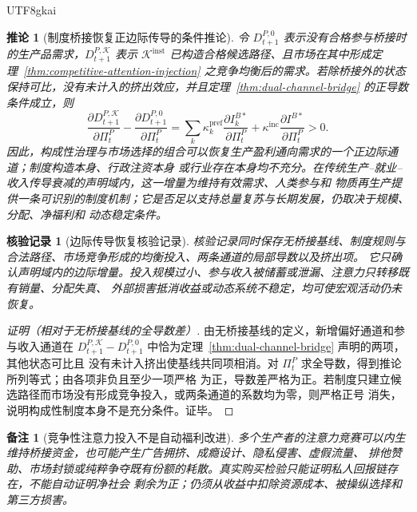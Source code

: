 \documentclass[12pt,a4paper,openany]{report}
\newtheorem{corollary}{推论}[chapter]
\newtheorem{remark}{备注}[chapter]
\newtheorem{Certificate}{核验记录}[chapter]
\begin{document}
\begin{CJK*}{UTF8}{gkai}
\begin{corollary}[制度桥接恢复正边际传导的条件推论]
\label{cor:institutional-bridge-restores-transmission}
令 \(D_{t+1}^{P,0}\) 表示没有合格参与桥接时的生产品需求，\(D_{t+1}^{P,\mathcal K}\) 表示
\(\mathcal K^{\mathrm{inst}}\) 已构造合格候选路径、且市场在其中形成定理~\ref{thm:competitive-attention-injection}
之竞争均衡后的需求。若除桥接外的状态保持可比，没有未计入的挤出效应，并且定理~\ref{thm:dual-channel-bridge}
的正导数条件成立，则
\[
  \frac{\partial D_{t+1}^{P,\mathcal K}}{\partial\Pi_t^P}
  -
  \frac{\partial D_{t+1}^{P,0}}{\partial\Pi_t^P}
  =
  \sum_k\kappa_k^{\mathrm{pref}}
  \frac{\partial I_k^{B*}}{\partial\Pi_t^P}
  +\kappa^{\mathrm{inc}}
  \frac{\partial I^{B*}}{\partial\Pi_t^P}
  >0.
\]
因此，构成性治理与市场选择的组合可以恢复生产盈利通向需求的一个正边际通道；制度构造本身、行政注资本身
或行业存在本身均不充分。在传统生产--就业--收入传导衰减的声明域内，这一增量为维持有效需求、人类参与和
物质再生产提供一条可识别的制度机制；它是否足以支持总量复苏与长期发展，仍取决于规模、分配、净福利和
动态稳定条件。
\end{corollary}

\begin{Certificate}[边际传导恢复核验记录]
核验记录同时保存无桥接基线、制度规则与合法路径、市场竞争形成的均衡投入、两条通道的局部导数以及挤出项。
它只确认声明域内的边际增量。投入规模过小、参与收入被储蓄或泄漏、注意力只转移既有销量、分配失真、
外部损害抵消收益或动态系统不稳定，均可使宏观活动仍未恢复。
\end{Certificate}

\begin{proof}[证明（相对于无桥接基线的全导数差）]
由无桥接基线的定义，新增偏好通道和参与收入通道在
\(D_{t+1}^{P,\mathcal K}-D_{t+1}^{P,0}\) 中恰为定理~\ref{thm:dual-channel-bridge} 声明的两项，其他状态可比且
没有未计入挤出使基线共同项相消。对 \(\Pi_t^P\) 求全导数，得到推论所列等式；由各项非负且至少一项严格
为正，导数差严格为正。若制度只建立候选路径而市场没有形成竞争投入，或两条通道的系数均为零，则严格正号
消失，说明构成性制度本身不是充分条件。证毕。
\end{proof}

\begin{remark}[竞争性注意力投入不是自动福利改进]
多个生产者的注意力竞赛可以内生维持桥接资金，也可能产生广告拥挤、成瘾设计、隐私侵害、虚假流量、
排他赞助、市场封锁或纯粹争夺既有份额的耗散。真实购买检验只能证明私人回报链存在，不能自动证明净社会
剩余为正；仍须从收益中扣除资源成本、被操纵选择和第三方损害。
\end{remark}


\end{CJK*}
\end{document}
